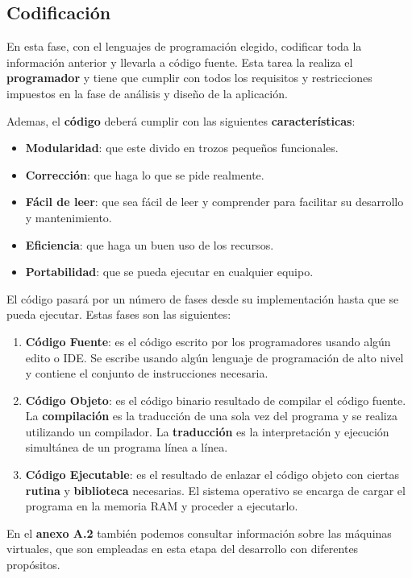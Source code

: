 \subsection{Codificación}
En esta fase, con el lenguajes de programación elegido, codificar toda la información anterior y llevarla a código fuente. Esta tarea la realiza el \textbf{programador} y tiene que cumplir con todos los requisitos y restricciones impuestos en la fase de análisis y diseño de la aplicación.

Ademas, el \textbf{código} deberá cumplir con las siguientes \textbf{características}:
\begin{itemize}
    \item \textbf{Modularidad}: que este divido en trozos pequeños funcionales.
    \item \textbf{Corrección}: que haga lo que se pide realmente.
    \item \textbf{Fácil de leer}: que sea fácil de leer y comprender para facilitar su desarrollo y mantenimiento.
    \item \textbf{Eficiencia}: que haga un buen uso de los recursos.
    \item \textbf{Portabilidad}: que se pueda ejecutar en cualquier equipo.
\end{itemize}

El código pasará por un número de fases desde su implementación hasta que se pueda ejecutar. Estas fases son las siguientes:

\begin{enumerate}
    \item \textbf{Código Fuente}: es el código escrito por los programadores usando algún edito o IDE. Se escribe usando algún lenguaje de programación de alto nivel y contiene el conjunto de instrucciones necesaria.
    \item \textbf{Código Objeto}: es el código binario resultado de compilar el código fuente. La \textbf{compilación} es la traducción de una sola vez del programa y se realiza utilizando un compilador. La \textbf{traducción} es la interpretación y ejecución simultánea de un programa línea a línea.
    \item \textbf{Código Ejecutable}: es el resultado de enlazar el código objeto con ciertas \textbf{\gls{rutina}} y \textbf{\gls{biblioteca}} necesarias. El sistema operativo se encarga de cargar el programa en la memoria RAM y proceder a ejecutarlo.
\end{enumerate}

En el \textbf{anexo A.2} también podemos consultar información sobre las máquinas virtuales, que son empleadas en esta etapa del desarrollo con diferentes propósitos.

